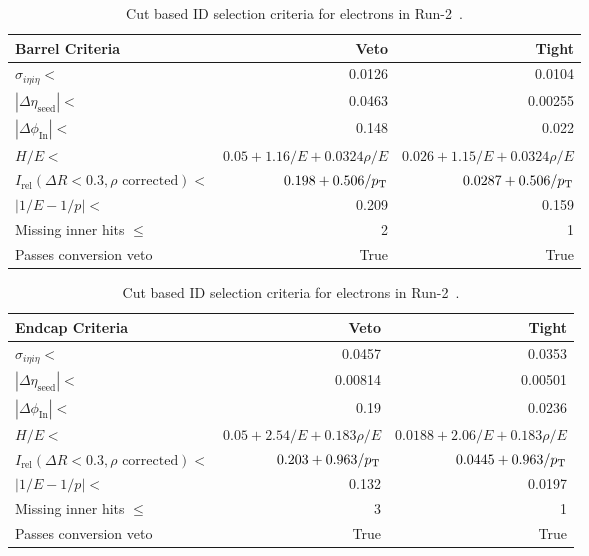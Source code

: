 \begin{table}[htb!]
	\centering
	\caption[Cut based ID selection criteria for electrons in Run-2~\cite{electronid}.]{Cut based ID selection criteria for electrons in Run-2~\cite{electronid}.}
	\label{tab:electronID}
	\begin{tabular}{l | r | r}
		\hline
		Barrel Criteria & Veto & Tight \\
		\hline
		\hline
		$\sigma_{i\eta i\eta}<$ & 0.0126 & 0.0104 \\
		$|\Delta\eta_\text{seed}|<$ & 0.0463 & 0.00255 \\
		$|\Delta\phi_\text{In}|<$ & 0.148 & 0.022 \\
		$H/E<$ & $0.05+1.16/E+0.0324\rho/E$ & $0.026+1.15/E+0.0324\rho/E$ \\
		$I_\text{rel}(\Delta R<0.3,\rho\text{ corrected})<$ & $0.198+0.506/p_{\mathrm{T}}$ & $0.0287+0.506/p_{\mathrm{T}}$\\
		$|1/E-1/p|<$  & 0.209 & 0.159 \\
		Missing inner hits $\leq$ & 2 & 1 \\
		Passes conversion veto & True & True\\
		\hline
	\end{tabular}
	\centering
	\begin{tabular}{l | r | r}
		\hline
		Endcap Criteria & Veto & Tight \\
		\hline
		\hline
		$\sigma_{i\eta i\eta}<$ & 0.0457 & 0.0353 \\
		$|\Delta\eta_\text{seed}|<$ & 0.00814 & 0.00501 \\
		$|\Delta\phi_\text{In}|<$ & 0.19 & 0.0236 \\
		$H/E<$ & $0.05+2.54/E+0.183\rho/E$ & $0.0188+2.06/E+0.183\rho/E$ \\
		$I_\text{rel}(\Delta R<0.3,\rho\text{ corrected})<$ & $0.203+0.963/p_{\mathrm{T}}$ & $0.0445+0.963/p_{\mathrm{T}}$\\
		$|1/E-1/p|<$ & 0.132 & 0.0197 \\
		Missing inner hits $\leq$ & 3 & 1 \\
		Passes conversion veto & True & True\\
		\hline
	\end{tabular}
\end{table}

